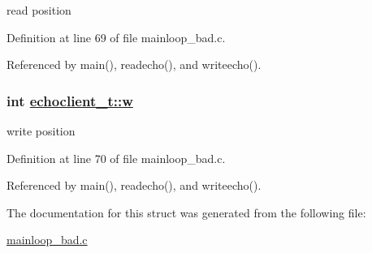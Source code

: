 read position 



Definition at line 69 of file mainloop\_\-bad.c.

Referenced by main(), readecho(), and writeecho().\hypertarget{structechoclient__t_o2}{
\subsubsection[w]{\setlength{\rightskip}{0pt plus 5cm}int \hyperlink{structechoclient__t_o2}{echoclient\_\-t::w}}}
\label{structechoclient__t_o2}


write position 



Definition at line 70 of file mainloop\_\-bad.c.

Referenced by main(), readecho(), and writeecho().

The documentation for this struct was generated from the following file:\begin{CompactItemize}
\item 
\hyperlink{mainloop__bad_8c}{mainloop\_\-bad.c}\end{CompactItemize}
